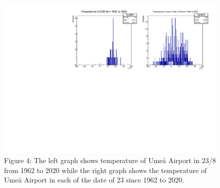 \documentclass[a4, 12pt]{article}
\begin{document}
\begin{figure}[H]
\centering
\includegraphics[scale=0.85]{chrisFig4.pdf}
 \caption*{Figure 4: The left graph shows temperature of Umeå Airport in 23/8 from 1962 to 2020 while the right graph shows the temperature of Umeå Airport in each of the date of 23 since 1962 to 2020.}

\end{figure}



\newpage
\end{document}
